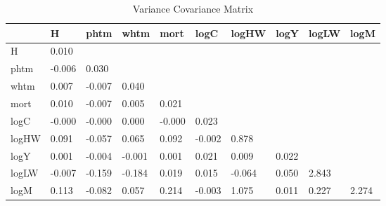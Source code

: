 \begin{table}[htbp]
\caption{\label{clabel} Variance Covariance Matrix}\centering\medskip
\begin{tabular}{llllllllll} \hline \hline
 & H  & phtm  & whtm  & mort  & logC  & logHW  & logY  & logLW  & logM  \\  \hline 
H &     0.010 \\  
phtm &    -0.006 &     0.030 \\  
whtm &     0.007 &    -0.007 &     0.040 \\  
mort &     0.010 &    -0.007 &     0.005 &     0.021 \\  
logC &    -0.000 &    -0.000 &     0.000 &    -0.000 &     0.023 \\  
logHW &     0.091 &    -0.057 &     0.065 &     0.092 &    -0.002 &     0.878 \\  
logY &     0.001 &    -0.004 &    -0.001 &     0.001 &     0.021 &     0.009 &     0.022 \\  
logLW &    -0.007 &    -0.159 &    -0.184 &     0.019 &     0.015 &    -0.064 &     0.050 &     2.843 \\  
logM &     0.113 &    -0.082 &     0.057 &     0.214 &    -0.003 &     1.075 &     0.011 &     0.227 &     2.274 \\  
\hline \hline \end{tabular}
\end{table}

